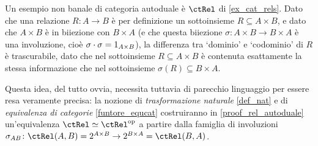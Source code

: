 \begin{example}\label{rel_autoduale}
 Un esempio non banale di categoria autoduale è \(\ctRel\) di \ref{ex_cat_rels}. Dato che una relazione \(R \colon A\to B\) è per definizione un sottoinsieme \(R\subseteq A\times B\), e dato che \(A\times B\) è in biiezione con \(B\times A\) (e che questa biiezione \(\sigma \colon A\times B \to B\times A\) è una involuzione, cioè \(\sigma\cdot\sigma = 1_{A\times B}\)), la differenza tra `dominio' e `codominio' di \(R\) è trascurabile, dato che nel sottoinsieme \(R \subseteq A\times B\) è contenuta esattamente la stessa informazione che nel sottoinsieme \(\sigma(R)\subseteq B\times A\).

 Questa idea, del tutto ovvia, necessita tuttavia di parecchio linguaggio per essere resa veramente precisa: la nozione di \emph{trasformazione naturale} \ref{def_nat} e di \emph{equivalenza di categorie} \ref{funtore_equcat} costruiranno in \ref{proof_rel_autoduale} un'equivalenza \(\ctRel\simeq \ctRel^\op\) a partire dalla famiglia di involuzioni \(\sigma_{AB} \colon \Hom{\ctRel}(A,B) = \pow {A\times B} \to \pow {B\times A} = \Hom{\ctRel}(B,A)\).
\end{example}
